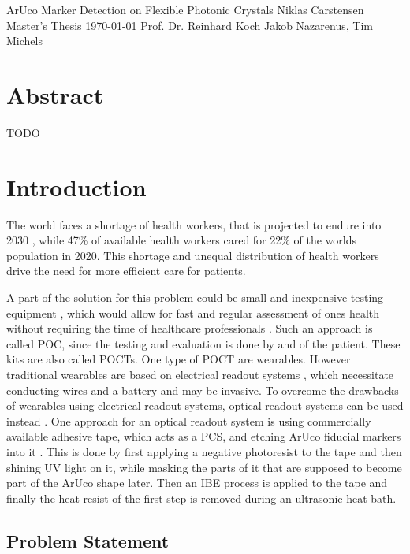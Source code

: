\documentclass[10pt]{book}
\newcommand*\NewPage{\newpage\null\thispagestyle{empty}\newpage}
\begin{document}
\frontmatter

\studtitlepage%
{ArUco Marker Detection on Flexible Photonic Crystals}%
{}
{Niklas Carstensen}%
{Master's Thesis}%
{\today}%
{Prof. Dr. Reinhard Koch}%
{Jakob Nazarenus, Tim Michels}%
\NewPage{}
\setcounter{page}{2}
\studeidesstatt
\NewPage{}

\setcounter{page}{3}
\chapter*{Abstract}
TODO

\tableofcontents
\listoffigures
\mainmatter
\chapter{Introduction}

The world faces a shortage of health workers, that is projected to endure into 2030 \cite{BMJHealthWorkforce22}, while 47\% of available health workers cared for 22\% of the worlds population in 2020. This shortage and unequal distribution of health workers drive the need for more efficient care for patients. 

A part of the solution for this problem could be small and inexpensive testing equipment \cite{Fab23}, which would allow for fast and regular assessment of ones health without requiring the time of healthcare professionals \cite{POC12}. Such an approach is called \ac{POC}, since the testing and evaluation is done by and of the patient. These kits are also called \acp{POCT}. One type of \ac{POCT} are wearables. However traditional wearables are based on electrical readout systems \cite{gao2019flexible}, which necessitate conducting wires and a battery and may be invasive. To overcome the drawbacks of wearables using electrical readout systems, optical readout systems can be used instead \cite{nguyen2021wearable}. One approach for an optical readout system is using commercially available adhesive tape, which acts as a \ac{PCS}, and etching \ac{ArUco} fiducial markers into it \cite{Fab23}. This is done by first applying a negative photoresist to the tape and then shining UV light on it, while masking the parts of it that are supposed to become part of the \ac{ArUco} shape later. Then an \ac{IBE} process is applied to the tape and finally the heat resist of the first step is removed during an ultrasonic heat bath.

\section{Problem Statement}
\end{document}
